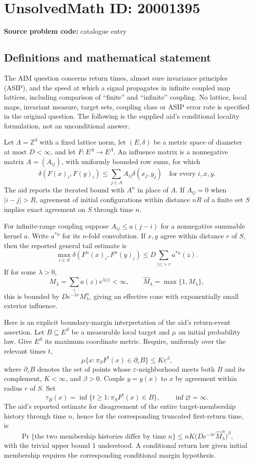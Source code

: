 \documentclass[11pt]{article}
\newcommand{\Z}{\mathbb{Z}}
\begin{document}
\section*{UnsolvedMath ID: 20001395}
\textbf{Source problem code:} catalogue entry
\subsection{Definitions and mathematical statement}
The AIM question concerns return times, almost sure invariance principles (ASIP), and the speed at which a signal propagates in infinite coupled map lattices, including comparison of ``finite'' and ``infinite'' coupling. No lattice, local maps, invariant measure, target sets, coupling class or ASIP error rate is specified in the original question. The following is the supplied aid's conditional locality formulation, not an unconditional answer.

Let \(\Lambda=\Z^d\) with a fixed lattice norm, let \((E,\delta)\) be a metric space of diameter at most \(D<\infty\), and let \(F:E^\Lambda\to E^\Lambda\). An influence matrix is a nonnegative matrix \(A=(A_{ij})\), with uniformly bounded row sums, for which
\[
 \delta(F(x)_i,F(y)_i)\leq\sum_{j\in\Lambda}A_{ij}\delta(x_j,y_j)
 \quad\text{for every }i,x,y.
\]
The aid reports the iterated bound with \(A^n\) in place of \(A\). If \(A_{ij}=0\) when \(|i-j|>R\), agreement of initial configurations within distance \(nR\) of a finite set \(S\) implies exact agreement on \(S\) through time \(n\).

For infinite-range coupling suppose \(A_{ij}\leq a(j-i)\) for a nonnegative summable kernel \(a\). Write \(a^{*n}\) for its \(n\)-fold convolution. If \(x,y\) agree within distance \(r\) of \(S\), then the reported general tail estimate is
\[
 \max_{i\in S}\delta(F^n(x)_i,F^n(y)_i)
 \leq D\sum_{|z|>r}a^{*n}(z).
\]
If for some \(\lambda>0\),
\[
 M_\lambda=\sum_z a(z)e^{\lambda|z|}<\infty,
 \qquad \widehat M_\lambda=\max\{1,M_\lambda\},
\]
this is bounded by \(De^{-\lambda r}M_\lambda^n\), giving an effective cone with exponentially small exterior influence.

Here is an explicit boundary-margin interpretation of the aid's return-event assertion. Let \(B\subseteq E^S\) be a measurable local target and \(\mu\) an initial probability law. Give \(E^S\) its maximum coordinate metric. Require, uniformly over the relevant times \(t\),
\[
 \mu\{x: \pi_SF^t(x)\in\partial_\varepsilon B\}\leq K\varepsilon^\beta,
\]
where \(\partial_\varepsilon B\) denotes the set of points whose \(\varepsilon\)-neighborhood meets both \(B\) and its complement, \(K<\infty\), and \(\beta>0\). Couple \(y=y(x)\) to \(x\) by agreement within radius \(r\) of \(S\). Set
\[
 \tau_B(x)=\inf\{t\geq1:\pi_SF^t(x)\in B\},
 \qquad\inf\varnothing=\infty.
\]
The aid's reported estimate for disagreement of the entire target-membership history through time \(n\), hence for the corresponding truncated first-return time, is
\[
 \Pr\{\text{the two membership histories differ by time }n\}
 \leq nK\bigl(De^{-\lambda r}\widehat M_\lambda^n\bigr)^\beta,
\]
with the trivial upper bound \(1\) understood. A conditional return law given initial membership requires the corresponding conditional margin hypothesis.
\end{document}
